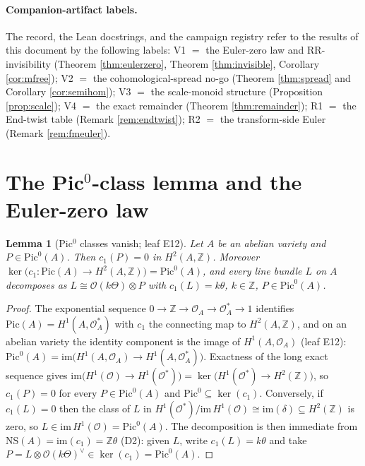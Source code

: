 \documentclass[11pt]{article}
\newtheorem{lemma}{Lemma}
\begin{document}
\paragraph{Companion-artifact labels.} The record, the Lean docstrings, and the campaign registry refer
to the results of this document by the following labels: V1 $=$ the Euler-zero law and RR-invisibility
(Theorem \ref{thm:eulerzero}, Theorem \ref{thm:invisible}, Corollary \ref{cor:mfree}); V2 $=$ the
cohomological-spread no-go (Theorem \ref{thm:spread} and Corollary \ref{cor:semihom}); V3 $=$ the
scale-monoid structure (Proposition \ref{prop:scale}); V4 $=$ the exact remainder
(Theorem \ref{thm:remainder}); R1 $=$ the End-twist table (Remark \ref{rem:endtwist}); R2 $=$ the
transform-side Euler (Remark \ref{rem:fmeuler}).

\section{The Pic$^0$-class lemma and the Euler-zero law}\label{sec:pic0}

\begin{lemma}[Pic$^0$ classes vanish; leaf E12]\label{lem:pic0}
Let $A$ be an abelian variety and $P\in\mathrm{Pic}^0(A)$. Then $c_1(P)=0$ in $H^2(A,\mathbb{Z})$.
Moreover $\ker\big(c_1:\mathrm{Pic}(A)\to H^2(A,\mathbb{Z})\big)=\mathrm{Pic}^0(A)$, and every line
bundle $L$ on $A$ decomposes as $L\cong\mathcal{O}(k\Theta)\otimes P$ with $c_1(L)=k\theta$,
$k\in\mathbb{Z}$, $P\in\mathrm{Pic}^0(A)$.
\end{lemma}

\begin{proof}
The exponential sequence $0\to\mathbb{Z}\to\mathcal{O}_A\to\mathcal{O}_A^\ast\to1$ identifies
$\mathrm{Pic}(A)=H^1(A,\mathcal{O}_A^\ast)$ with $c_1$ the connecting map to $H^2(A,\mathbb{Z})$, and on
an abelian variety the identity component is the image of $H^1(A,\mathcal{O}_A)$
(leaf E12): $\mathrm{Pic}^0(A)=\mathrm{im}\big(H^1(A,\mathcal{O}_A)\to H^1(A,\mathcal{O}_A^\ast)\big)$.
Exactness of the long exact sequence gives
$\mathrm{im}\big(H^1(\mathcal{O})\to H^1(\mathcal{O}^\ast)\big)=\ker\big(H^1(\mathcal{O}^\ast)\to
H^2(\mathbb{Z})\big)$, so $c_1(P)=0$ for every $P\in\mathrm{Pic}^0(A)$ and
$\mathrm{Pic}^0\subseteq\ker(c_1)$. Conversely, if $c_1(L)=0$ then the class of $L$ in
$H^1(\mathcal{O}^\ast)/\mathrm{im}\,H^1(\mathcal{O})\cong\mathrm{im}(\delta)\subseteq H^2(\mathbb{Z})$ is
zero, so $L\in\mathrm{im}\,H^1(\mathcal{O})=\mathrm{Pic}^0(A)$. The decomposition is then immediate from
$\mathrm{NS}(A)=\mathrm{im}(c_1)=\mathbb{Z}\theta$ (D2): given $L$, write $c_1(L)=k\theta$ and take
$P=L\otimes\mathcal{O}(k\Theta)^{\vee}\in\ker(c_1)=\mathrm{Pic}^0(A)$.
\end{proof}
\end{document}
